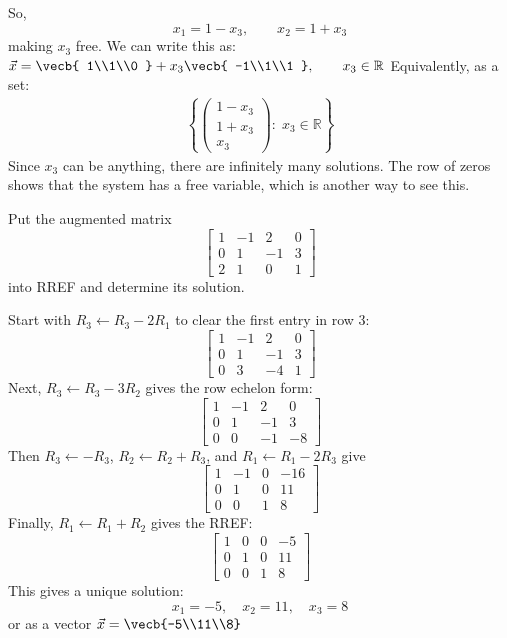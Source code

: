 \begin{Answer}[ref=infinitelymany]
So, 
$$x_1 = 1 - x_3,\qquad x_2 = 1 + x_3$$
making $x_3$ free.
We can write this as:
$\vec{x}
=
\vecb{
1\\1\\0
}
+
x_3
\vecb{
-1\\1\\1
},
\qquad x_3\in\mathbb{R}$
Equivalently, as a set:
$$\begin{array}{c} \left\{
\begin{pmatrix}
1-x_3\\
1+x_3\\
x_3
\end{pmatrix}
:\; x_3\in\mathbb{R}
\right\} \end{array}$$
Since $x_3$ can be anything, there are infinitely many solutions. The row of zeros shows that the system has a free variable, which is another way to see this.
\end{Answer}
\begin{Exercise}[title=Augmented Matrices 2, label=uniquesol]
Put the augmented matrix
$$\begin{bmatrix}
1&-1&2&0\\
0&1&-1&3\\
2&1&0&1
\end{bmatrix}$$
into RREF and determine its solution.
\end{Exercise}
\begin{Answer}[ref=uniquesol]
Start with $R_3 \leftarrow R_3 - 2R_1$ to clear the first entry in row 3:
$$\begin{bmatrix}
1&-1&2&0\\
0&1&-1&3\\
0&3&-4&1
\end{bmatrix}$$
Next, $R_3 \leftarrow R_3 - 3R_2$ gives the row echelon form:
$$\begin{bmatrix}
1&-1&2&0\\
0&1&-1&3\\
0&0&-1&-8
\end{bmatrix}$$
Then $R_3 \leftarrow -R_3$, $R_2 \leftarrow R_2 + R_3$, and $R_1 \leftarrow R_1 - 2R_3$ give
$$\begin{bmatrix}
1&-1&0&-16\\
0&1&0&11\\
0&0&1&8
\end{bmatrix}$$
Finally, $R_1 \leftarrow R_1 + R_2$ gives the RREF:
$$\begin{bmatrix}
1&0&0&-5\\
0&1&0&11\\
0&0&1&8
\end{bmatrix}$$
This gives a unique solution:
$$x_1=-5,\quad x_2=11,\quad x_3=8$$
or as a vector
\(
\vec{x} = \vecb{-5\\11\\8}
\)
\end{Answer}

